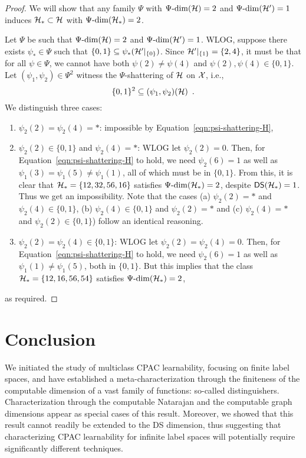 \documentclass[11pt]{article}
\begin{document}
\begin{proof}
     We will show that any family $\Psi$ with $\Psi\text{-}\mathrm{dim}(\mathcal{H})=2$ and $\Psi\text{-}\mathrm{dim}(\mathcal{H}')=1$ induces $\mathcal{H}_*\subset\mathcal{H}$ with $\Psi\text{-}\mathrm{dim}(\mathcal{H}_*)=2$.

     Let $\Psi$ be such that $\Psi\text{-}\mathrm{dim}(\mathcal{H})=2$ and $\Psi\text{-}\mathrm{dim}(\mathcal{H}')=1$.
     WLOG, suppose there exists $\psi_*\in\Psi$ such that $\{0,1\}\subseteq\psi_*(\mathcal{H}'|_{\{0\}})$.
      Since $\mathcal{H}'|_{\{1\}}=\{2,4\}$, it must be that for all $\psi\in\Psi$, we cannot have both $\psi(2)\neq\psi(4)$ and $\psi(2),\psi(4)\in\{0,1\}$. 
     Let $(\psi_1,\psi_2)\in\Psi^2$ witness the $\Psi$-shattering of $\mathcal{H}$ on $\mathcal{X}$, i.e., 
     \begin{equation}
         \label{eqn:psi-shattering-H}
         \{0,1\}^2\subseteq (\psi_1,\psi_2)(\mathcal{H})\enspace.
     \end{equation}
     We distinguish three cases:
     \begin{enumerate}
         \item $\psi_2(2)=\psi_2(4)=*$: impossible by Equation~\ref{eqn:psi-shattering-H},
        \item $\psi_2(2)\in\{0,1\}$ and $\psi_2(4)=*$: WLOG let $\psi_2(2)=0$. 
         Then, for Equation~\ref{eqn:psi-shattering-H} to hold, we need $\psi_2(6)=1$ as well as $\psi_1(3)=\psi_1(5)\neq\psi_1(1)$, all of which must be in $\{0,1\}$.
         From this, it is clear that $\mathcal{H}_*=\{12,32,56,16\}$ satisfies $\Psi\text{-}\mathrm{dim}(\mathcal{H}_*)=2$, despite $\mathsf{DS}(\mathcal{H}_*) =1$. Thus we get an impossibility.
         Note that the cases (a) $\psi_2(2)=*$ and $\psi_2(4)\in\{0,1\}$, (b) $\psi_2(4)\in\{0,1\}$ and $\psi_2(2)=*$ and (c) $\psi_2(4)=*$ and $\psi_2(2)\in\{0,1\}$) follow an identical reasoning.
         \item $\psi_2(2)=\psi_2(4)\in\{0,1\}$: WLOG let $\psi_2(2)=\psi_2(4)=0$. Then, for Equation~\ref{eqn:psi-shattering-H} to hold, we need $\psi_2(6)=1$ as well as $\psi_1(1)\neq\psi_1(5)$, both in $\{0,1\}$. 
         But this implies that the class $\mathcal{H}_*=\{12,16,56,54\}$ satisfies $\Psi\text{-}\mathrm{dim}(\mathcal{H}_*)=2$,
     \end{enumerate}
     as required.
\end{proof}

\section{Conclusion}

We initiated the study of multiclass CPAC learnability, focusing on finite label spaces, and have established a meta-characterization through the finiteness of the computable dimension of a vast family of functions: so-called distinguishers. Characterization through the computable Natarajan and the computable graph dimensions appear as special cases of this result. 
Moreover, we showed that this result cannot readily be extended to the DS dimension, thus suggesting that characterizing CPAC learnability for infinite label spaces will potentially require significantly different techniques.
\end{document}

